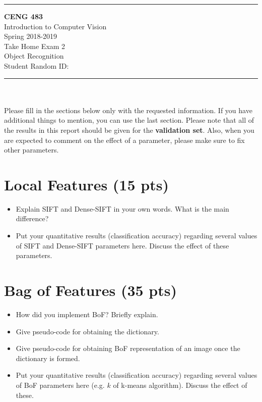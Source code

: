 \documentclass[12pt]{article}
\newcommand{\HRule}{\rule{\linewidth}{1mm}}
\begin{document}
\noindent
\HRule %
\small
\begin{center}
	\LARGE \textbf{CENG 483} \\[4mm]
	\Large Introduction to Computer Vision \\[4mm]
	\normalsize Spring 2018-2019 \\
	\Large Take Home Exam 2 \\
	\Large Object Recognition \\
    \Large Student Random ID: \\
\end{center}
\HRule

\begin{center}
\end{center}
\vspace{-10mm}
\noindent\\ \\ 
Please fill in the sections below only with the requested information. If you have additional things to mention, you can use the last section. Please note that all of the results in this report should be given for the \textbf{validation set}. Also, when you are expected to comment on the effect of a parameter, please make sure to fix other parameters.

\section{Local Features (15 pts)}

    \begin{itemize}
        \item Explain SIFT and Dense-SIFT in your own words. What is the main difference?
        
        \item Put your quantitative results (classification accuracy) regarding several values of SIFT and Dense-SIFT parameters here. Discuss the effect of these parameters.
    \end{itemize}


\section{Bag of Features (35 pts)}
    \begin{itemize}
        \item How did you implement BoF? Briefly explain.
        \item Give pseudo-code for obtaining the dictionary.
        \item Give pseudo-code for obtaining BoF representation of an image once the dictionary is formed. 
        \item Put your quantitative results (classification accuracy) regarding several values of BoF parameters here (e.g. $k$ of k-means algorithm). Discuss the effect of these.
    \end{itemize}
\end{document}
